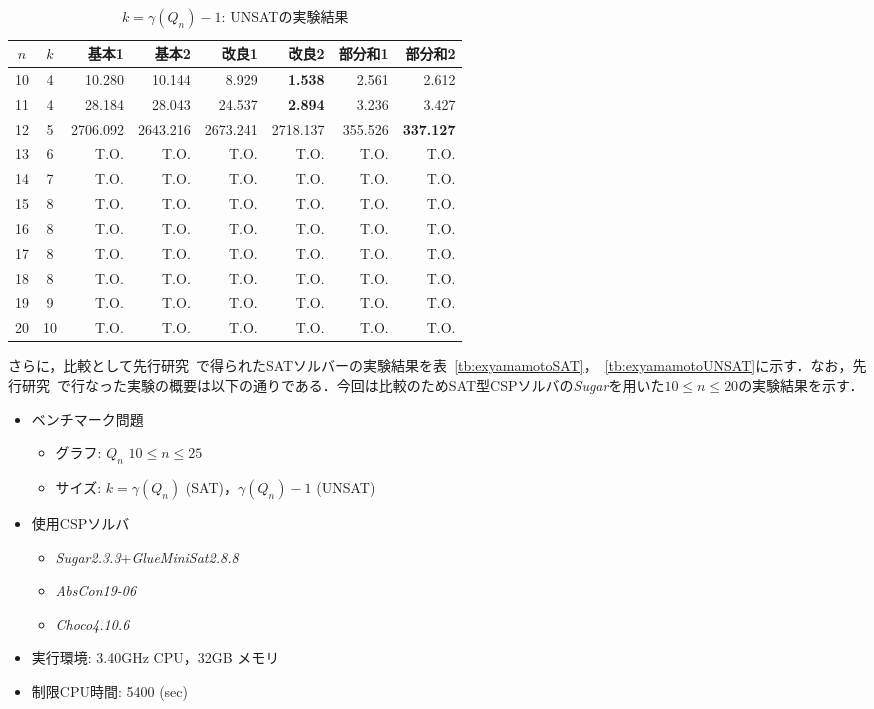 \begin{table}[ht]
 \caption{$k=\gamma(Q_n)-1$: UNSATの実験結果}
 \label{tb:exUNSAT}
 \centering 
 \begin{tabular}{c|c|r|r|r|r|r|r} \hline
  $n$ & $k$ & 基本1 & 基本2 & 改良1 & 改良2 & 部分和1 & 部分和2 \\ \hline
  10 & 4 & 10.280 & 10.144 & 8.929 & \textbf{1.538} & 2.561 & 2.612 \\
  11 & 4 & 28.184 & 28.043 & 24.537 & \textbf{2.894} & 3.236 & 3.427 \\
  12 & 5 & 2706.092 & 2643.216 & 2673.241 & 2718.137 & 355.526 & \textbf{337.127} \\
  13 & 6 & T.O. & T.O. & T.O. & T.O. & T.O. & T.O. \\  
  14 & 7 & T.O. & T.O. & T.O. & T.O. & T.O. & T.O. \\   
  15 & 8 & T.O. & T.O. & T.O. & T.O. & T.O. & T.O. \\  
  16 & 8 & T.O. & T.O. & T.O. & T.O. & T.O. & T.O. \\
  17 & 8 & T.O. & T.O. & T.O. & T.O. & T.O. & T.O. \\
  18 & 8 & T.O. & T.O. & T.O. & T.O. & T.O. & T.O. \\
  19 & 9 & T.O. & T.O. & T.O. & T.O. & T.O. & T.O. \\
  20 & 10 & T.O. & T.O. & T.O. & T.O. & T.O. & T.O. \\ \hline
 \end{tabular}
\end{table}
\newpage
さらに，比較として先行研究~\cite{yamamoto21}で得られたSATソルバーの実験結果を表~\ref{tb:exyamamotoSAT}，~\ref{tb:exyamamotoUNSAT}に示す．なお，先行研究~\cite{yamamoto21}で行なった実験の概要は以下の通りである．今回は比較のためSAT型CSPソルバの\textit{Sugar}を用いた$10 \le n \le 20$の実験結果を示す．
\begin{itemize}
 \item ベンチマーク問題
 \begin{itemize}
      \item グラフ: $Q_{n}$ $10 \le n \le 25$ 
      \item サイズ: $ k = \gamma(Q_n)$ (SAT)，$\gamma(Q_n)-1$ (UNSAT)%
 \end{itemize}
 \item 使用CSPソルバ
       \begin{itemize}
	\item \textit{Sugar2.3.3}+\textit{GlueMiniSat2.8.8}
	\item \textit{AbsCon19-06}
	\item \textit{Choco4.10.6}
       \end{itemize}
 \item 実行環境: 3.40GHz CPU，32GB メモリ
 \item 制限CPU時間: 5400 (sec)
\end{itemize}
